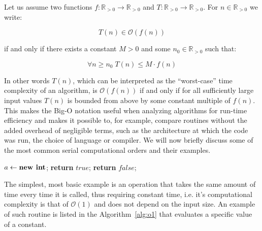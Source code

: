 \begin{definition}
Let us assume two functions $f:\mathbb{R}_{>0}\rightarrow\mathbb{R}_{>0}$ and $T:\mathbb{R}_{>0}\rightarrow\mathbb{R}_{>0}$. 
For $n \in \mathbb{R}_{>0}$ we write:

\begin{equation}
T(n) \in \mathcal{O}\left(f(n)\right)
\label{eq:bigOh}
\end{equation}

\noindent
if and only if there exists a constant $M>0$ and some $n_0 \in \mathbb{R}_{>0}$ such that:

\begin{equation}
\forall n\geq n_{0}\;T(n)\leq M \cdot f(n)
\end{equation}
\end{definition}


In other words $T(n)$, which can be interpreted as the ``worst-case'' time complexity of an algorithm,
is $\mathcal{O}\left(f(n)\right)$ if and only if for all sufficiently large input values $T(n)$ is bounded from above by some constant multiple of $f(n)$.
This makes the Big-O notation useful when analyzing algorithms for run-time efficiency and makes it possible to, for example, compare routines without the added overhead of negligible terms, such as the architecture at which the code was run, the choice of language or compiler.
We will now briefly discuss some of the most common serial computational orders and their examples. 

\begin{algorithm}[h!]
\centering
\begin{algorithmic}[1]
\State $a \gets \text{\textbf{new int}}$;
%
%
\State \textbf{return} $true$;
%
\Else 
%
\State \textbf{return} $false$;
%
\EndIf
\end{algorithmic}
\caption{
{ \footnotesize 
{\bf Single test operation.} 
} %
}
\label{alg:o1}
\end{algorithm}

The simplest, most basic example is an operation that takes the same amount of time every time it is called, thus requiring constant time, i.e. it's computational complexity is that of $\mathcal{O}\left(1\right)$ and does not depend on the input size.
An example of such routine is listed in the Algorithm~\ref{alg:o1} that evaluates a specific value of a constant.

